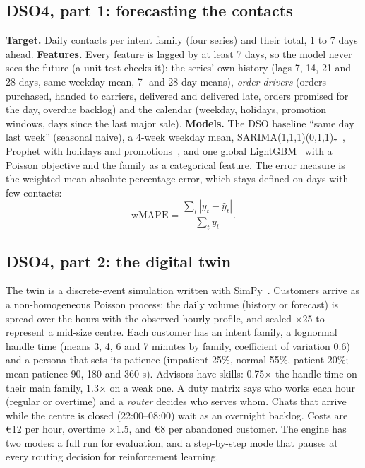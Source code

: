 \subsection{DSO4, part 1: forecasting the contacts}
\textbf{Target.} Daily contacts per intent family (four series) and their total, 1 to 7 days ahead.
\textbf{Features.} Every feature is lagged by at least 7 days, so the model never sees the future (a unit test
checks it): the series' own history (lags 7, 14, 21 and 28 days, same-weekday mean, 7- and 28-day means),
\emph{order drivers} (orders purchased, handed to carriers, delivered and delivered late, orders promised for
the day, overdue backlog) and the calendar (weekday, holidays, promotion windows, days since the last major
sale). \textbf{Models.} The DSO baseline ``same day last week'' (seasonal naive), a 4-week weekday mean,
SARIMA(1,1,1)(0,1,1)$_7$~\cite{hyndman}, Prophet with holidays and promotions~\cite{prophet}, and one global
LightGBM~\cite{lightgbm} with a Poisson objective and the family as a categorical feature. The error measure
is the weighted mean absolute percentage error, which stays defined on days with few contacts:
\begin{equation}
\text{wMAPE} = \frac{\sum_t |y_t - \hat{y}_t|}{\sum_t y_t}.
\end{equation}

\subsection{DSO4, part 2: the digital twin}
The twin is a discrete-event simulation written with SimPy~\cite{simpy}. Customers arrive as a
non-homogeneous Poisson process: the daily volume (history or forecast) is spread over the hours with the
observed hourly profile, and scaled $\times$25 to represent a mid-size centre. Each customer has an intent
family, a lognormal handle time (means 3, 4, 6 and 7 minutes by family, coefficient of variation 0.6) and a
persona that sets its patience (impatient 25\%, normal 55\%, patient 20\%; mean patience 90, 180 and 360 s).
Advisors have skills: 0.75$\times$ the handle time on their main family, 1.3$\times$ on a weak one. A duty
matrix says who works each hour (regular or overtime) and a \emph{router} decides who serves whom. Chats that
arrive while the centre is closed (22:00--08:00) wait as an overnight backlog. Costs are €12 per hour, overtime
$\times$1.5, and €8 per abandoned customer. The engine has two modes: a full run for evaluation, and a
step-by-step mode that pauses at every routing decision for reinforcement learning.

